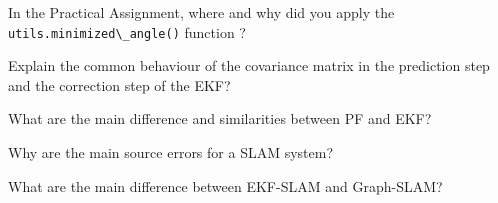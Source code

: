 \documentclass[parcial]{lcc}
\begin{document}
\maketitle




\ejercicio In the Practical Assignment, where and why did you apply the \lstinline[style=python]{utils.minimized\_angle()} function ?


\ejercicio Explain the common behaviour of the covariance matrix in the prediction step and the correction step of the EKF?

\ejercicio What are the main difference and similarities between PF and EKF?





\ejercicio Why are the main source errors for a SLAM system?

\ejercicio What are the main difference between EKF-SLAM and Graph-SLAM?


\ejercicio 
\end{document}
